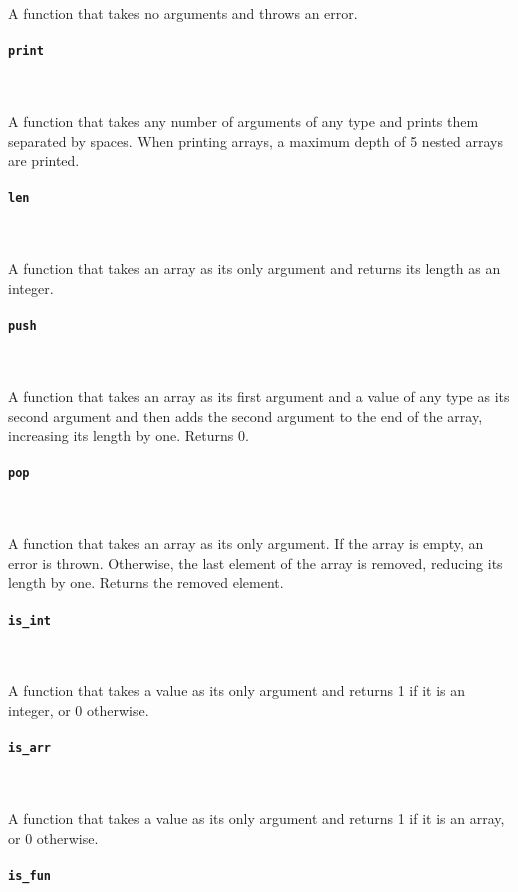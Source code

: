 A function that takes no arguments and throws an error.

\paragraph{\texttt{print}} \

A function that takes any number of arguments of any type and prints them separated by spaces. When printing arrays, a maximum depth of 5 nested arrays are printed.

\paragraph{\texttt{len}} \

A function that takes an array as its only argument and returns its length as an integer.

\paragraph{\texttt{push}} \

A function that takes an array as its first argument and a value of any type as its second argument and then adds the second argument to the end of the array, increasing its length by one. Returns 0.

\paragraph{\texttt{pop}} \

A function that takes an array as its only argument. If the array is empty, an error is thrown. Otherwise, the last element of the array is removed, reducing its length by one. Returns the removed element.

\paragraph{\texttt{is\_int}} \

A function that takes a value as its only argument and returns 1 if it is an integer, or 0 otherwise.

\paragraph{\texttt{is\_arr}} \

A function that takes a value as its only argument and returns 1 if it is an array, or 0 otherwise.

\paragraph{\texttt{is\_fun}} \

